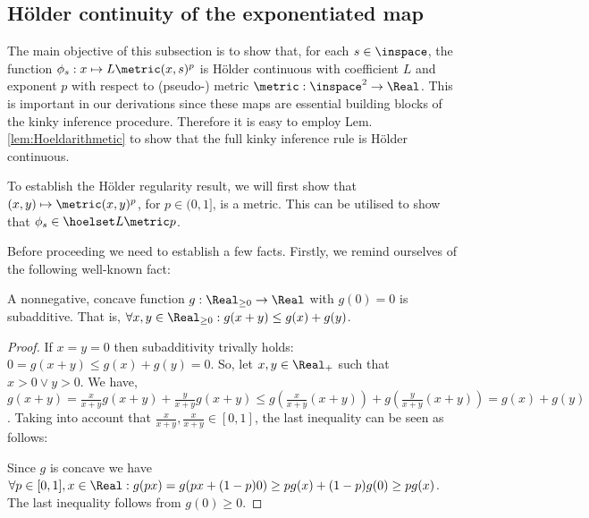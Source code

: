 

\subsection{H\"older continuity of the exponentiated map }

The main objective of this subsection is to show that, for each $s \in \inspace$, the function $\phi_s: x \mapsto L \metric(x,s)^p$ is H\"older continuous with coefficient $L$ and exponent $p$ with respect to (pseudo-) metric $\metric: \inspace^2 \to \Real$. This is important in our derivations since these maps are essential building blocks of the kinky inference procedure. Therefore it is easy to employ Lem. \ref{lem:Hoeldarithmetic} to show that the full kinky inference rule is H\"older continuous.

To establish the H\"older regularity result, we will first show that $(x,y) \mapsto \metric(x,y)^p$, for $p \in (0,1] $, is a metric.  This can be utilised to show that
$\phi_s \in \hoelset L \metric p$.




Before proceeding we need to establish a few facts. 
Firstly, we remind ourselves of the following well-known fact:
\begin{lem} \label{lem:pd_n_concave_subadditive}
A nonnegative, concave function $g:\Real_{\geq 0} \to \Real$ with $g(0) = 0$ is subadditive. 
That is, $\forall x,y \in \Real_{\geq 0}: g(x+y) \leq g(x) + g(y)$. 
 \begin{proof}
If $x = y = 0$ then subadditivity trivally holds:  $0=g(x+y) \leq g(x) + g(y) = 0$.
So, let $x, y \in \Real_+$ such that $x >0 \vee y >0$.
We have, $g( x +y) = \frac{x}{x+y} g(x+y) + \frac{y}{x+y} g(x+y) \leq g(\frac{x}{x+y} (x+y) ) +  g(\frac{y}{x+y}(x+y)) = g(x) + g(y)$.
Taking into account that $\frac{x}{x+y}, \frac{x}{x+y} \in [0,1]$, the last inequality can be seen as follows:

 Since $g$ is concave we have 
$\forall p \in [0,1], x \in \Real: g(p x) =  g(px + (1-p) 0) \geq p g(x) + (1-p) g(0) \geq p g(x)  $. The last inequality follows from $g(0) \geq 0$.
\end{proof}
\end{lem}

